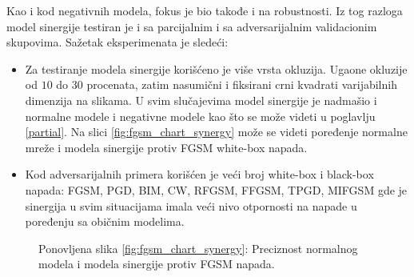 Kao i kod negativnih modela, fokus je bio takođe i na robustnosti. Iz tog razloga model sinergije testiran je i sa parcijalnim i sa adversarijalnim validacionim skupovima. Sažetak eksperimenata je sledeći:

\begin{itemize}
    \item Za testiranje modela sinergije korišćeno je više vrsta okluzija. Ugaone okluzije od $10$ do $30$ procenata, zatim nasumični i fiksirani crni kvadrati varijabilnih dimenzija na slikama. U svim slučajevima model sinergije je nadmašio i normalne modele i negativne modele kao što se može videti u poglavlju \ref{partial}. Na slici \ref{fig:fgsm_chart_synergy} može se videti poređenje normalne mreže i modela sinergije protiv FGSM white-box napada.
    \item Kod adversarijalnih primera korišćen je veći broj white-box i black-box napada: FGSM, PGD, BIM, CW, RFGSM, FFGSM, TPGD, MIFGSM gde je sinergija u svim situacijama imala veći nivo otpornosti na napade u poređenju sa običnim modelima.
\end{itemize}

\begin{figure}
    \centering
    {\vskip 0cm Ponovljena slika \ref{fig:fgsm_chart_synergy}: Preciznost normalnog modela i modela sinergije protiv FGSM napada.}
\end{figure}

